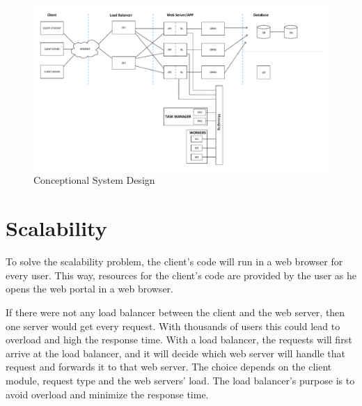 \begin{landscape}
	\begin{figure}[!htbp]
		\centering
		\includegraphics[height=0.95\textwidth]{figures/atfogo_rendszerterv_teljes.pdf}
		\caption[Conceptional System Design]{Conceptional System Design}
		\label{fig:conceptional-system-design}
	\end{figure}
\end{landscape}

\section{Scalability}

To solve the scalability problem, the client's code will run in a web browser for every user. This way, resources for the client's code are provided by the user as he opens the web portal in a web browser.
 
If there were not any load balancer between the client and the web server, then one server would get every request. With thousands of users this could lead to overload and high the response time. With a load balancer, the requests will first arrive at the load balancer, and it will decide which web server will handle that request and forwards it to that web server. The choice depends on the client module, request type and the web servers' load. The load balancer's purpose is to avoid overload and minimize the response time.


